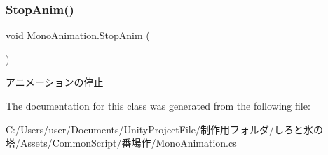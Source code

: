\subsubsection{\texorpdfstring{Stop\+Anim()}{StopAnim()}}
{\footnotesize\ttfamily void Mono\+Animation.\+Stop\+Anim (\begin{DoxyParamCaption}{ }\end{DoxyParamCaption})\hspace{0.3cm}{\ttfamily [inline]}}



アニメーションの停止 



The documentation for this class was generated from the following file\+:\begin{DoxyCompactItemize}
\item 
C\+:/\+Users/user/\+Documents/\+Unity\+Project\+File/制作用フォルダ/しろと氷の塔/\+Assets/\+Common\+Script/番場作/Mono\+Animation.\+cs\end{DoxyCompactItemize}

